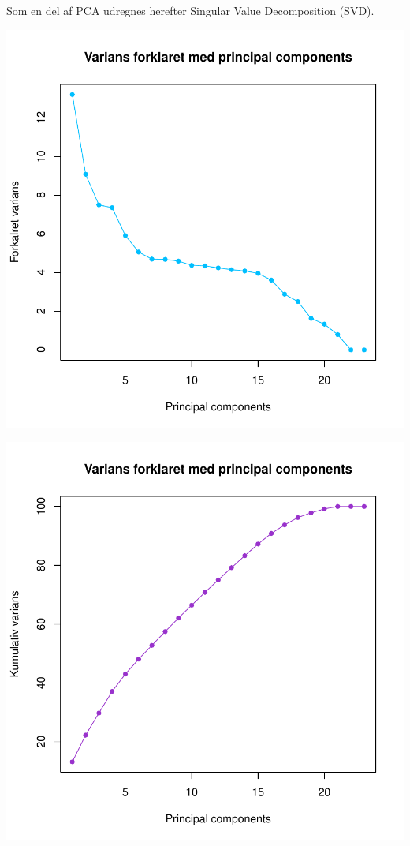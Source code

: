 \documentclass{report}
\begin{document}
Som en del af PCA udregnes herefter Singular Value Decomposition (SVD).


\includegraphics{rapport_latex-008}

\includegraphics{rapport_latex-009}
\end{document}
